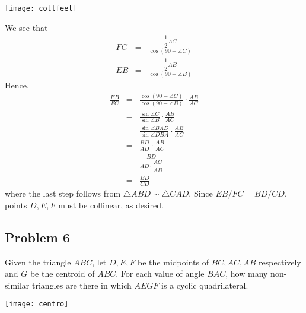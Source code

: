 \begin{center}
    \texttt{[image: collfeet]}
\end{center}

\begin{mdsoln}
    We see that\begin{eqnarray*}FC&=&\frac{\dfrac{1}{2}AC}{\cos(90-\angle C)}\\ EB&=&\frac{\dfrac{1}{2}AB}{\cos(90-\angle B)}\end{eqnarray*}Hence,\begin{eqnarray*}\frac{EB}{FC}&=&\frac{\cos(90-\angle C)}{\cos(90-\angle B)}\cdot \frac{AB}{AC}\\ &=&\frac{\sin\angle C}{\sin\angle B}\cdot \frac{AB}{AC}\\ &=&\frac{\sin\angle BAD}{\sin\angle DBA}\cdot \frac{AB}{AC}\\ &=&\frac{BD}{AD}\cdot \frac{AB}{AC}\\ &=&\frac{BD}{AD\cdot \dfrac{AC}{AB}}\\ &=&\frac{BD}{CD}\end{eqnarray*}where the last step follows from $\triangle ABD\sim \triangle CAD$. Since $EB/FC=BD/CD$, points $D,E,F$ must be collinear, as desired.    
\end{mdsoln}



\subsection{Problem 6}
Given the triangle $ABC$, let $D, E, F$ be the midpoints of $BC, AC, AB$ respectively and $G$ be the centroid of $ABC$. For each value of angle $BAC$, how many non-similar triangles are there in which $AEGF$ is a cyclic quadrilateral.

\begin{center}
    \texttt{[image: centro]}
\end{center}

